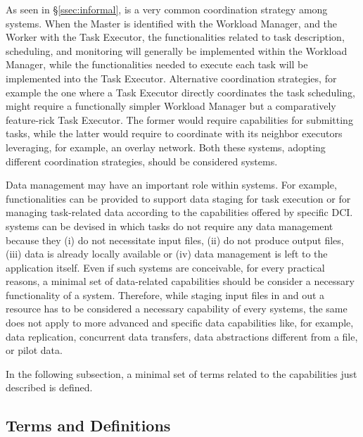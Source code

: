 \documentclass{sig-alternate}
\begin{document}
As seen in \S\ref{ssec:informal}, \MW is a very common coordination
strategy among \pilot systems. When the Master is identified with the
Workload Manager, and the Worker with the Task Executor, the
functionalities related to task description, scheduling, and monitoring
will generally be implemented within the Workload Manager, while the
functionalities needed to execute each task will be implemented into the
Task Executor. Alternative coordination strategies, for example the one
where a Task Executor directly coordinates the task scheduling, might
require a functionally simpler Workload Manager but a comparatively
feature-rick Task Executor. The former would require capabilities for
submitting tasks, while the latter would require to coordinate with its
neighbor executors leveraging, for example, an overlay network. Both
these systems, adopting different coordination strategies, should be
considered \pilotjob systems.

Data management may have an important role within \pilotjob systems. For
example, functionalities can be provided to support data staging for task
execution or for managing task-related data according to the capabilities
offered by specific DCI. \pilotjob systems can be devised in which tasks do not
require any data management because they (i) do not necessitate input files,
(ii) do not produce output files, (iii) data is already locally available or
(iv) data management is left to the application itself. Even if such systems are
conceivable, for every practical reasons, a minimal set of data-related
capabilities should be consider a necessary functionality of a \pilotjob system.
Therefore, while staging input files in and out a resource has to be considered
a necessary capability of every \pilotjob systems, the same does not apply to
more advanced and specific data capabilities like, for example, data
replication, concurrent data transfers, data abstractions different from a file,
or pilot data.

In the following subsection, a minimal set of terms related to the
capabilities just described is defined.

\subsection{Terms and Definitions}
\label{subsec:vocab_terms_and_definitions}
\end{document}
